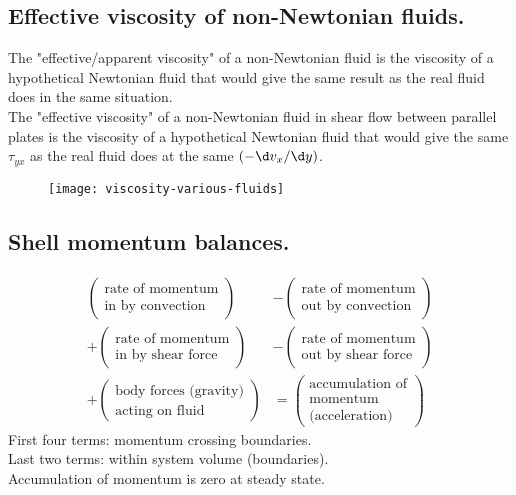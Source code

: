 \subsection{Effective viscosity of non-Newtonian fluids.}
The "effective/apparent viscosity" of a non-Newtonian fluid is the viscosity of a hypothetical Newtonian fluid that would give the same result as the real fluid does in the same situation.\\
The "effective viscosity" of a non-Newtonian fluid in shear flow between parallel plates is the viscosity of a hypothetical Newtonian fluid that would give the same $\tau_{yx}$ as the real fluid does at the same $(-\d v_x/\d y)$.
\begin{figure}[H]
	\centering
	\texttt{[image: viscosity-various-fluids]}
\end{figure}

\subsection{Shell momentum balances.}
\begin{align*}
	\begin{pmatrix}\text{rate of momentum} \\ \text{in by convection}\end{pmatrix}
	 & -\begin{pmatrix}\text{rate of momentum} \\ \text{out by convection}\end{pmatrix}                \\
	+\begin{pmatrix}\text{rate of momentum} \\ \text{in by shear force}\end{pmatrix}
	 & -\begin{pmatrix}\text{rate of momentum} \\ \text{out by shear force}\end{pmatrix}               \\
	+\begin{pmatrix}\text{body forces (gravity)} \\ \text{acting on fluid}\end{pmatrix}
	 & =\begin{pmatrix}\text{accumulation of} \\ \text{momentum} \\ \text{(acceleration)}\end{pmatrix}
\end{align*}
First four terms: momentum crossing boundaries.\\
Last two terms: within system volume (boundaries).\\
Accumulation of momentum is zero at steady state.

